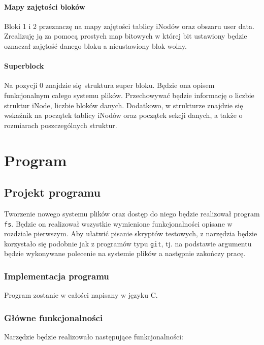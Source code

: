 \documentclass{mwrep}
\begin{document}
\subsubsection{Mapy zajętości bloków}
Bloki 1 i 2 przeznaczę na mapy zajętości tablicy iNodów oraz obszaru user data. Zrealizuję ją za pomocą prostych map bitowych w której
bit ustawiony będzie oznaczał zajętość danego bloku a nieustawiony blok wolny.

\subsubsection{Superblock}
Na pozycji 0 znajdzie się struktura super bloku. Będzie ona opisem funkcjonalnym całego systemu plików. Przechowywać będzie
informację o liczbie struktur iNode, liczbie bloków danych. Dodatkowo, w strukturze znajdzie się wskaźnik na początek 
tablicy iNodów oraz początek sekcji danych, a także o rozmiarach poszczególnych struktur.  

\chapter{Program}
\section{Projekt programu}
Tworzenie nowego systemu plików oraz dostęp do niego będzie realizował program \texttt{fs}. Będzie on realizował 
wszystkie wymienione funkcjonalności opisane w rozdziale pierwszym. Aby ułatwić pisanie skryptów testowych,
z narzędzia będzie korzystało się podobnie jak z programów typu \texttt{git}, tj. na podstawie argumentu będzie wykonywane polecenie 
na systemie plików a następnie zakończy pracę.  

\subsection{Implementacja programu}
Program zostanie w całości napisany w języku C. 

\subsection{Główne funkcjonalności}
Narzędzie będzie realizowało następujące funkcjonalności:
\end{document}
